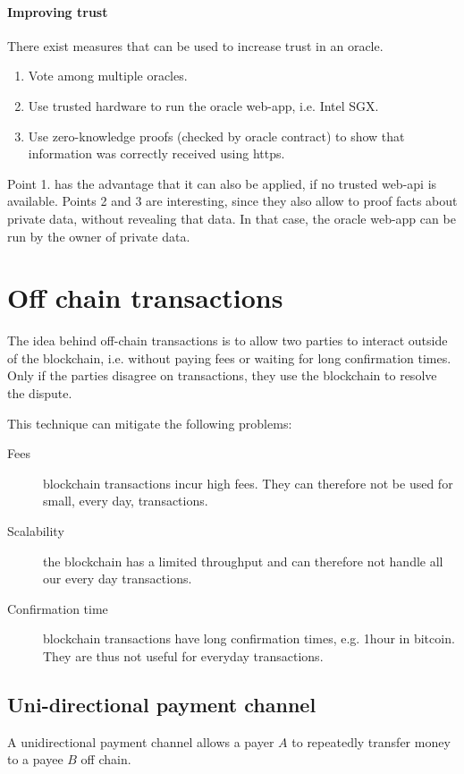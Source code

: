 \paragraph{Improving trust}
There exist measures that can be used to increase trust in an oracle.

\begin{enumerate}
	\item Vote among multiple oracles.
	\item Use trusted hardware to run the oracle web-app, i.e. Intel SGX.
	\item Use zero-knowledge proofs (checked by oracle contract) to show that information was correctly received using https.
\end{enumerate}

\noindent
Point 1. has the advantage that it can also be applied, if no trusted web-api is available.
Points 2 and 3 are interesting, since they also allow to proof facts about private data, without revealing that data. In that case, the oracle web-app can be run by the owner of private data.


\section{Off chain transactions}
The idea behind off-chain transactions is to allow two parties to interact outside of the blockchain, i.e. without paying fees or waiting for long confirmation times. Only if the parties disagree on transactions, they use the blockchain to resolve the dispute.

This technique can mitigate the following problems:
\begin{description}
	\item[Fees] blockchain transactions incur high fees. They can therefore not be used for small, every day, transactions.
	\item[Scalability] the blockchain has a limited throughput and can therefore not handle all our every day transactions.
	\item[Confirmation time] blockchain transactions have long confirmation times, e.g. 1hour in bitcoin. They are thus not useful for everyday transactions.
\end{description}

\subsection{Uni-directional payment channel}
A unidirectional payment channel allows a payer $A$ to repeatedly transfer money to a payee $B$ off chain.


